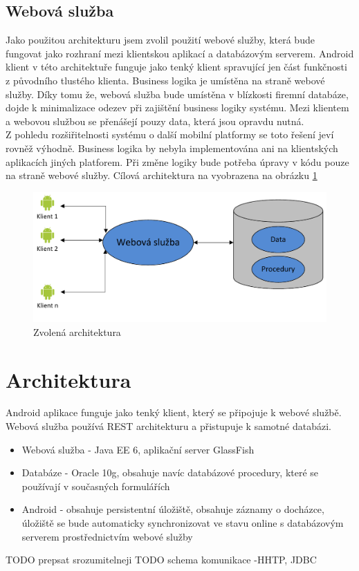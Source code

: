 \documentclass{diplomka}
\begin{document}
\subsection{Webová služba}
Jako použitou architekturu jsem zvolil použití webové služby, která bude fungovat jako rozhraní mezi klientskou aplikací a databázovým serverem. Android klient v této architektuře funguje jako tenký klient spravující jen část funkčnosti z původního tlustého klienta. Business logika je umístěna na straně webové služby. Díky tomu že, webová služba bude umístěna v blízkosti firemní databáze, dojde k minimalizace odezev při zajištění business logiky systému. Mezi klientem a webovou službou se přenášejí pouzy data, která jsou opravdu nutná. \\ \indent
Z pohledu rozšiřitelnosti systému o další mobilní platformy se toto řešení jeví rovněž výhodně. Business logika by nebyla implementována ani na klientských aplikacích jiných platforem. Při změne logiky bude potřeba úpravy v kódu pouze na straně webové služby. Cílová architektura na vyobrazena na obrázku \ref{obr:arch}

\begin{figure}[H]
  \centering
  \includegraphics[scale=0.8]{obr/souc_arch2.pdf}
\caption{Zvolená architektura}
\label{obr:arch}
\end{figure}

\section{Architektura}
Android aplikace funguje jako tenký klient, který se připojuje k webové službě. Webová služba používá REST architekturu a přistupuje k samotné databázi.

\begin{itemize}
\item Webová služba - Java EE 6, aplikační server GlassFish
\item Databáze - Oracle 10g, obsahuje navíc databázové procedury, které se používají v současných formulářích  
\item Android - obsahuje persistentní úložiště, obsahuje záznamy o docházce, úložiště se bude automaticky synchronizovat ve stavu online s databázovým serverem prostřednictvím webové služby
\end{itemize}
TODO prepsat srozumitelneji
TODO schema komunikace -HHTP, JDBC
\end{document}
